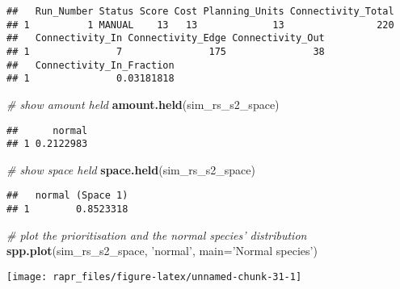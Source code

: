 \documentclass[11pt,]{article}
\newenvironment{Shaded}{\begin{snugshade}}{\end{snugshade}}
\newcommand{\KeywordTok}[1]{\textcolor[rgb]{0.13,0.29,0.53}{\textbf{{#1}}}}
\newcommand{\DataTypeTok}[1]{\textcolor[rgb]{0.13,0.29,0.53}{{#1}}}
\newcommand{\StringTok}[1]{\textcolor[rgb]{0.31,0.60,0.02}{{#1}}}
\newcommand{\CommentTok}[1]{\textcolor[rgb]{0.56,0.35,0.01}{\textit{{#1}}}}
\newcommand{\NormalTok}[1]{{#1}}
\let\origfigure\figure
\let\endorigfigure\endfigure
\renewenvironment{figure}[1][2] {
	\expandafter\origfigure\expandafter[H]
} {
	\endorigfigure
}
\begin{document}
\begin{verbatim}
##   Run_Number Status Score Cost Planning_Units Connectivity_Total
## 1          1 MANUAL    13   13             13                220
##   Connectivity_In Connectivity_Edge Connectivity_Out
## 1               7               175               38
##   Connectivity_In_Fraction
## 1               0.03181818
\end{verbatim}

\begin{Shaded}
\begin{Highlighting}[]
\CommentTok{# show amount held}
\KeywordTok{amount.held}\NormalTok{(sim_rs_s2_space)}
\end{Highlighting}
\end{Shaded}

\begin{verbatim}
##      normal
## 1 0.2122983
\end{verbatim}

\begin{Shaded}
\begin{Highlighting}[]
\CommentTok{# show space held}
\KeywordTok{space.held}\NormalTok{(sim_rs_s2_space)}
\end{Highlighting}
\end{Shaded}

\begin{verbatim}
##   normal (Space 1)
## 1        0.8523318
\end{verbatim}

\begin{Shaded}
\begin{Highlighting}[]
\CommentTok{# plot the prioritisation and the normal species' distribution}
\KeywordTok{spp.plot}\NormalTok{(sim_rs_s2_space, }\StringTok{'normal'}\NormalTok{, }\DataTypeTok{main=}\StringTok{'Normal species'}\NormalTok{)}
\end{Highlighting}
\end{Shaded}

\begin{figure}

{\centering \texttt{[image: rapr\_files/figure-latex/unnamed-chunk-31-1]} 

}

\caption{A prioritisation for the normally distributed species generated using amount-based targets (20\%) and space-based targets (85\%). See Figure 3 caption for conventions.}\label{fig:unnamed-chunk-31}
\end{figure}
\end{document}
